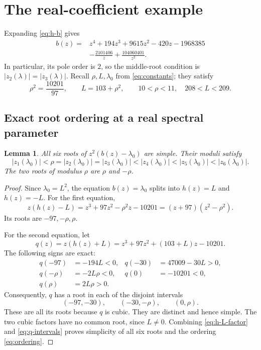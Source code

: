 \documentclass[11pt,a4paper]{amsart}
\newtheorem{lemma}[theorem]{Lemma}
\theoremstyle{remark}
\numberwithin{equation}{section}
\begin{document}
\section{The real-coefficient example}
\label{sec:real-spectrum}

Expanding \eqref{eq:h-b} gives
\begin{equation}
 \begin{split}
 b(z)={}&z^4+194z^3+9615z^2-420z-1968385\\
        &-\frac{2101406}{z}+\frac{104060401}{z^2}.
 \end{split}
 \label{eq:b-expanded}
\end{equation}
In particular, its pole order is \(2\), so the middle-root condition is
\(|z_2(\lambda)|=|z_3(\lambda)|\). Recall \(\rho,L,\lambda_0\) from \eqref{eq:constants}; they satisfy
\begin{equation}
 \rho^2=\frac{10201}{97},\qquad L=103+\rho^2,
 \qquad 10<\rho<11,\quad 208<L<209.
 \label{eq:rho-L}
\end{equation}

\subsection{Exact root ordering at a real spectral parameter}

\begin{lemma}
\label{lem:ordering}
All six roots of \(z^2(b(z)-\lambda_0)\) are simple. Their moduli satisfy
\begin{equation}
 |z_1(\lambda_0)|<\rho
 =|z_2(\lambda_0)|=|z_3(\lambda_0)|
 <|z_4(\lambda_0)|<|z_5(\lambda_0)|<|z_6(\lambda_0)|.
 \label{eq:ordering}
\end{equation}
The two roots of modulus \(\rho\) are \(\rho\) and \(-\rho\).
\end{lemma}

\begin{proof}
Since \(\lambda_0=L^2\), the equation \(b(z)=\lambda_0\) splits into \(h(z)=L\) and \(h(z)=-L\). For the first equation,
\begin{equation}
 z(h(z)-L)
  =z^3+97z^2-\rho^2z-10201
  =(z+97)(z^2-\rho^2).
 \label{eq:h-L-factor}
\end{equation}
Its roots are \(-97,-\rho,\rho\).

For the second equation, let
\[
 q(z)=z(h(z)+L)=z^3+97z^2+(103+L)z-10201.
\]
The following signs are exact:
\begin{align*}
 q(-97)&=-194L<0, & q(-30)&=47009-30L>0,\\
 q(-\rho)&=-2L\rho<0, & q(0)&=-10201<0,\\
 q(\rho)&=2L\rho>0.&&
\end{align*}
Consequently, \(q\) has a root in each of the disjoint intervals
\begin{equation}
 (-97,-30),\qquad (-30,-\rho),\qquad (0,\rho).
 \label{eq:q-intervals}
\end{equation}
These are all its roots because \(q\) is cubic. They are distinct and hence simple. The two cubic factors have no common root, since \(L\neq0\). Combining \eqref{eq:h-L-factor} and \eqref{eq:q-intervals} proves simplicity of all six roots and the ordering \eqref{eq:ordering}.
\end{proof}
\end{document}
